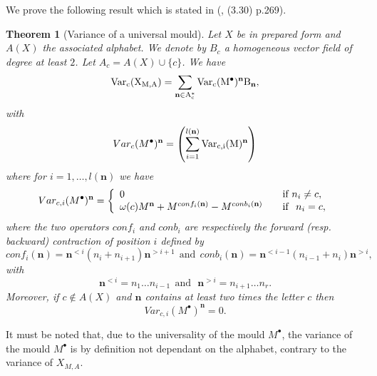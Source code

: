 \documentclass[english,11pt]{amsart}
\newtheorem{theorem}{Theorem}
\def\nn{\mathbf{n}}
\def\var{\rm Var}
\def\di{\displaystyle}
\def\nn{\mathbf{n}}
\begin{document}
We prove the following result which is stated in (\cite{ev}, (3.30) p.269). 

\begin{theorem}[Variance of a universal mould]
    Let $X$ be in prepared form and $A(X)$ the associated alphabet. We denote by $B_c$ a homogeneous vector field of degree at least $2$. Let $A_c =A(X)\cup \{c\}$. We have 
    \begin{equation}
    \var_c (X_{M ,A} )=\di\sum_{\nn \in A_c^*} Var_c (M^{\bullet} )^{\nn}  B_{\nn} ,
\end{equation}
with 
\begin{equation}
Var_c (M^{\bullet} )^{\nn} =\left ( \di\sum_{i=1}^{l(\nn )} \var_{c,i} (M)^{\nn} \right )
\end{equation}
where for $i=1,\dots ,l(\nn )$ we have 
\begin{equation}
    Var_{c,i} (M^{\bullet} )^{\nn} = \left \{ 
    \begin{array}{ll}
    0 & \ \ \ \mbox{\rm if}\ n_i \not = c ,\\
    \omega (c) M^{\nn} + M^{conf_i (\nn )} -M^{conb_i (\nn )} &\ \ \ {\rm if}\ \ n_i =c,
    \end{array}
    \right .
\end{equation}
where the two operators $conf_i$ and $conb_i$ are respectively the {\it forward (resp. backward) contraction of position $i$} defined by
\begin{equation}
    conf_i (\nn ) =\nn^{<i} (n_i +n_{i+1}) \nn^{>i+1}\ \ 
    \mbox{and}
    \ \ 
    conb_i (\nn ) =\nn^{<i-1} (n_{i-1} +n_i) \nn^{>i} ,
\end{equation}
with
\begin{equation}
    \nn^{<i} =n_1 \dots n_{i-1} \ \ \mbox{and}\ \ \ 
    \nn^{>i} =n_{i+1} \dots n_r .
\end{equation}
Moreover, if $c\not\in A(X)$ and $\nn$ contains at least two times the letter $c$ then \begin{equation}
     Var_{c,i} (M^{\bullet} )^{\nn} =0 .
\end{equation}



\end{theorem}

It must be noted that, due to the universality of the mould $M^{\bullet}$, the variance of the mould $M^{\bullet}$ is by definition not dependant on the alphabet, contrary to the variance of $X_{M,A}$.
\end{document}
